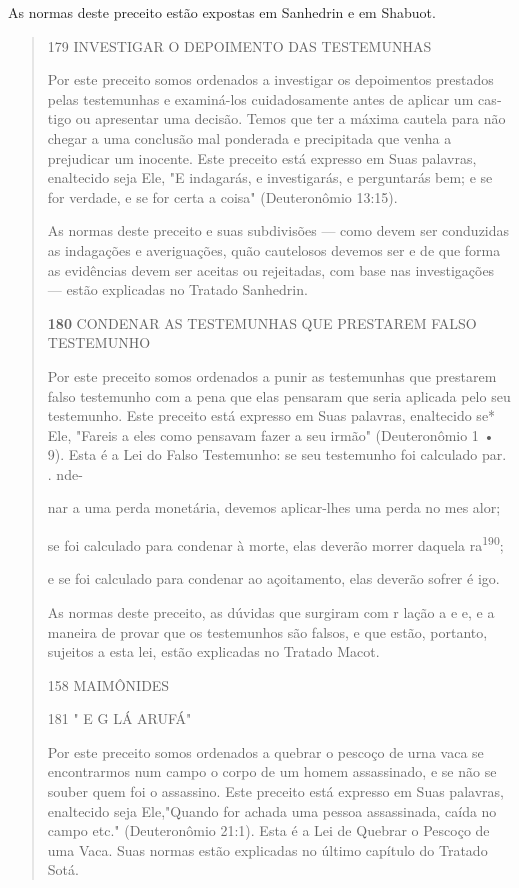 As normas deste preceito estão expostas em Sanhedrin e em Shabuot.

\begin{quote}
179 INVESTIGAR O DEPOIMENTO DAS TESTEMUNHAS

Por este preceito somos ordenados a investigar os depoimentos pres­tados
pelas testemunhas e examiná-los cuidadosamente antes de aplicar um
cas­tigo ou apresentar uma decisão. Temos que ter a máxima cautela para
não che­gar a uma conclusão mal ponderada e precipitada que venha a
prejudicar um inocente. Este preceito está expresso em Suas palavras,
enaltecido seja Ele, "E indagarás, e investigarás, e perguntarás bem; e
se for verdade, e se for certa a coisa" (Deuteronômio 13:15).

As normas deste preceito e suas subdivisões --- como devem ser
con­duzidas as indagações e averiguações, quão cautelosos devemos ser e
de que forma as evidências devem ser aceitas ou rejeitadas, com base nas
investiga­ções --- estão explicadas no Tratado Sanhedrin.

\textbf{180} CONDENAR AS TESTEMUNHAS QUE PRESTAREM FALSO TESTEMUNHO

Por este preceito somos ordenados a punir as testemunhas que pres­tarem
falso testemunho com a pena que elas pensaram que seria aplicada pelo
seu testemunho. Este preceito está expresso em Suas palavras, enaltecido
se* Ele, "Fareis a eles como pensavam fazer a seu irmão" (Deuteronômio 1
• 9). Esta é a Lei do Falso Testemunho: se seu testemunho foi calculado
par. . nde-

nar a uma perda monetária, devemos aplicar-lhes uma perda no mes alor;

se foi calculado para condenar à morte, elas deverão morrer daquela
ra\textsuperscript{190};

e se foi calculado para condenar ao açoitamento, elas deverão sofrer é
igo.

As normas deste preceito, as dúvidas que surgiram com r lação a e e, e a
maneira de provar que os testemunhos são falsos, e que estão, portanto,
sujeitos a esta lei, estão explicadas no Tratado Macot.

158 MAIMÔNIDES

181 " E G LÁ ARUFÁ"

Por este preceito somos ordenados a quebrar o pescoço de urna vaca se
encontrarmos num campo o corpo de um homem assassinado, e se não se
souber quem foi o assassino. Este preceito está expresso em Suas
pala­vras, enaltecido seja Ele,"Quando for achada uma pessoa
assassinada, caída no campo etc." (Deuteronômio 21:1). Esta é a Lei de
Quebrar o Pescoço de uma Vaca. Suas normas estão explicadas no último
capítulo do Tratado Sotá.


\end{quote}
